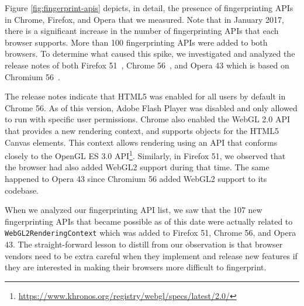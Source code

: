 Figure \ref{fig:fingerprint-apis} depicts, in detail, the presence of
fingerprinting APIs in Chrome, Firefox, and Opera that we measured. Note that
in January 2017, there is a significant increase in the number of
fingerprinting APIs that each browser supports. More than 100
fingerprinting APIs were added to both browsers. To determine what
caused this spike, we investigated and analyzed the release notes of
both Firefox 51~\cite{firefox-51-notes}, Chrome
56~\cite{chrome-56-notes}, and Opera 43 which is based on Chromium 56~\cite{opera-43-notes}.

The release notes indicate that HTML5 was enabled for all users by
default in Chrome 56. As of this version, Adobe Flash Player was
disabled and only allowed to run with specific user permissions.
Chrome also enabled the WebGL 2.0 API that provides a new rendering
context, and supports objects for the HTML5 Canvas elements. This
context allows rendering using an API that conforms closely to the
OpenGL ES 3.0
API\footnote{\url{https://www.khronos.org/registry/webgl/specs/latest/2.0/}}.
Similarly, in Firefox 51, we observed that the browser had also added
WebGL2 support during that time. The same happened to Opera 43 since Chromium 56
added WebGL2 support to its codebase.

When we analyzed our fingerprinting API list, we saw that the 107 new
fingerprinting APIs that became possible as of this date were actually
related to \texttt{WebGL2RenderingContext} which was added to Firefox
51, Chrome 56, and Opera 43. The straight-forward lesson to distill from our
observation is that browser vendors need to be extra careful when they
implement and release new features if they are interested in making
their browsers more difficult to fingerprint.


